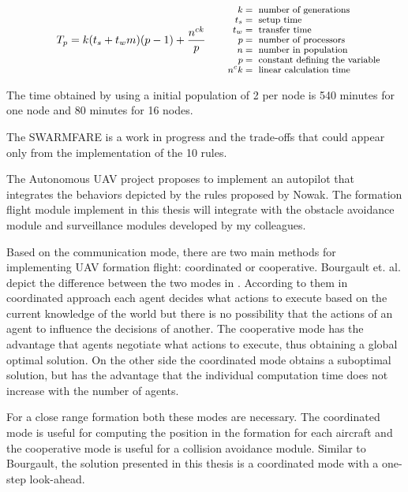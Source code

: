 \begin{equation}
T_{p} = k (t_{s}+t_{w}m)(p-1) + \frac{n^{ck}}{p}
\qquad\parbox{4.0cm}{\footnotesize$\begin{aligned} 
 k &= \text{ number of generations}
  \\[-1.0ex] t_{s} &= \text{ setup time}
  \\[-1.0ex] t_{w} &= \text{ transfer time}
  \\[-1.0ex] p &= \text{ number of processors}
  \\[-1.0ex] n &= \text{ number in population}
  \\[-1.0ex] p &= \text{ constant defining the variable}
  \\[-1.0ex] n^ck &= \text{ linear calculation time}
\end{aligned}$}
\label{eqn: nowak-paralel-time}
\end{equation}

The time obtained by using a initial population of 2 per node
is 540 minutes for one node and 80 minutes for 16 nodes.

The SWARMFARE is a work in progress and the trade-offs that could appear only
from the implementation of the 10 rules. 

The Autonomous UAV project proposes to implement an autopilot that integrates
the behaviors depicted by the rules proposed by Nowak. The formation flight module
implement in this thesis will integrate with the obstacle avoidance module and
surveillance modules developed by my colleagues.

Based on the communication mode, there are two main methods for implementing 
UAV formation flight: coordinated or cooperative. Bourgault et. al. depict the
difference between the two modes in \cite{bayesian}. According to them
in coordinated approach each agent decides what actions to execute based
on the current knowledge of the world but there is no possibility that the actions
of an agent to influence the decisions of another. The cooperative mode has the
advantage that agents negotiate what actions to execute, thus obtaining a 
global optimal solution. On the other side the coordinated mode obtains a 
suboptimal solution, but has the advantage that the individual computation 
time does not increase with the number of agents.

For a close range formation both these modes are necessary. The coordinated
mode is useful for computing the position in the formation for each aircraft 
and the cooperative mode is useful for a collision avoidance module. 
Similar to Bourgault, the solution presented in this thesis is
a coordinated mode with a one-step look-ahead.

